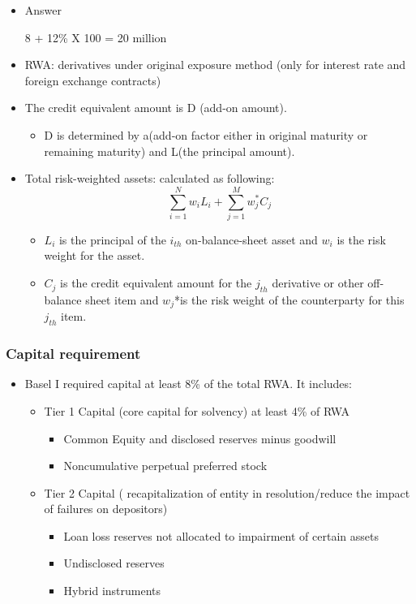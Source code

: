\begin{itemize}
\item Answer

8 + 12\% X 100 = 20 million

\item RWA: derivatives under original exposure method (only for interest rate and foreign exchange contracts)
\item The credit equivalent amount is D (add-on amount).
    \begin{itemize}
    \item D is determined by a(add-on factor either in original maturity or remaining maturity) and L(the principal amount).
    \end{itemize}
\item Total risk-weighted assets: calculated as following:
    \begin{equation}
    \sum_{i=1}^{N} w_i L_i + \sum_{j=1}^{M} w_j^* C_j
    \end{equation}
    \begin{itemize}
    \item $L_i$ is the principal of the $i_{th}$ on-balance-sheet asset and $w_i$
    is the risk weight for the asset.
    \item  $C_j$ is the credit equivalent amount for the $j_{th}$ derivative or
    other off-balance sheet item and $w_j$*is the risk weight of
    the counterparty for this $j_{th}$ item.
    \end{itemize}
\end{itemize}





\subsubsection{Capital requirement}
\begin{itemize}
\item Basel I required capital at least 8\% of the total RWA. It includes:
    \begin{itemize}
    \item Tier 1 Capital (core capital for solvency) at least 4\% of RWA
        \begin{itemize}
        \item Common Equity and disclosed reserves minus goodwill
        \item Noncumulative perpetual preferred stock
        \end{itemize}
    \item Tier 2 Capital ( recapitalization of entity in resolution/reduce the impact of failures on depositors)
        \begin{itemize}
        \item Loan loss reserves not allocated to impairment of certain assets
        \item Undisclosed reserves
        \item Hybrid instruments
        \end{itemize}
    \end{itemize}
\end{itemize}



